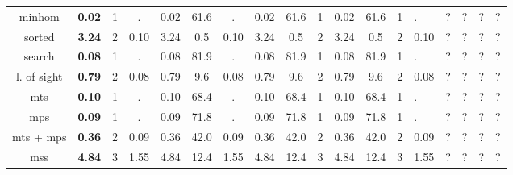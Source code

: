 \begin{table}
{\begin{tabular}[h]{|c| c|c|c|| c|c|c || c|c|c|| c|c|c|}
			minhom                     & {\bf 0.02}                  & 1                                         & .                                          & 0.02                                     & 61.6 & .          & 0.02   & 61.6 & 1          & 0.02   & 61.6 & 1 & .     & ? & ? & ? & ? \\
			sorted                     & {\bf 3.24}                  & 2                                         & 0.10                                       & 3.24                                     & 0.5  & 0.10       & 3.24   & 0.5  & 2          & 3.24   & 0.5  & 2 & 0.10  & ? & ? & ? & ? \\
			search                     & {\bf 0.08}                  & 1                                         & .                                          & 0.08                                     & 81.9 & .          & 0.08   & 81.9 & 1          & 0.08   & 81.9 & 1 & .     & ? & ? & ? & ? \\
			l. of sight                & {\bf 0.79}                  & 2                                         & 0.08                                       & 0.79                                     & 9.6  & 0.08       & 0.79   & 9.6  & 2          & 0.79   & 9.6  & 2 & 0.08  & ? & ? & ? & ? \\
			mts                        & {\bf 0.10}                  & 1                                         & .                                          & 0.10                                     & 68.4 & .          & 0.10   & 68.4 & 1          & 0.10   & 68.4 & 1 & .     & ? & ? & ? & ? \\
			mps                        & {\bf 0.09}                  & 1                                         & .                                          & 0.09                                     & 71.8 & .          & 0.09   & 71.8 & 1          & 0.09   & 71.8 & 1 & .     & ? & ? & ? & ? \\
			mts + mps                  & {\bf 0.36}                  & 2                                         & 0.09                                       & 0.36                                     & 42.0 & 0.09       & 0.36   & 42.0 & 2          & 0.36   & 42.0 & 2 & 0.09  & ? & ? & ? & ? \\
			mss                        & {\bf 4.84}                  & 3                                         & 1.55                                       & 4.84                                     & 12.4 & 1.55       & 4.84   & 12.4 & 3          & 4.84   & 12.4 & 3 & 1.55  & ? & ? & ? & ? \\
			\hline
		\end{tabular}
	}
\end{table}
